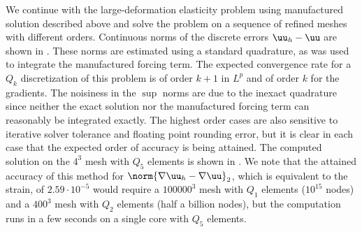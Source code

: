 We continue with the large-deformation elasticity problem using manufactured solution described above and solve the problem on a sequence of refined meshes with different orders.
Continuous norms of the discrete errors $\uu_h - \uu$ are shown in .
These norms are estimated using a standard quadrature, as was used to integrate the manufactured forcing term.
The expected convergence rate for a $Q_k$ discretization of this problem is of order $k+1$ in $L^p$ and of order $k$ for the gradients.
The noisiness in the $\sup$ norms are due to the inexact quadrature since neither the exact solution nor the manufactured forcing term can reasonably be integrated exactly.
The highest order cases are also sensitive to iterative solver tolerance and floating point rounding error, but it is clear in each case that the expected order of accuracy is being attained.
The computed solution on the $4^3$ mesh with $Q_5$ elements is shown in .
We note that the attained accuracy of this method for $\norm{\nabla \uu_h - \nabla\uu}_2$, which is equivalent to the strain, of $2.59\cdot 10^{-5}$ would require a $100000^3$ mesh with $Q_1$ elements ($10^{15}$ nodes) and a $400^3$ mesh with $Q_2$ elements (half a billion nodes), but the computation runs in a few seconds on a single core with $Q_5$ elements.

